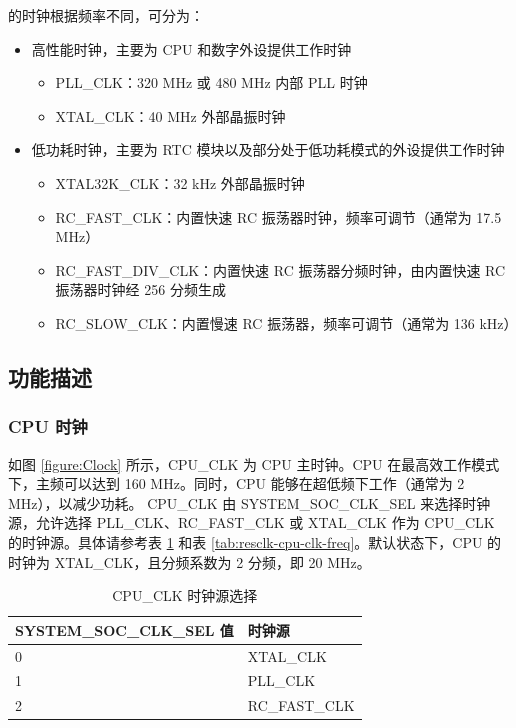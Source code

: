 \documentclass[main\_\_CN.tex]{subfiles}
\begin{document}
\chipname{} 的时钟根据频率不同，可分为：
\begin{itemize}
    \item 高性能时钟，主要为 CPU 和数字外设提供工作时钟
    \begin{itemize}
        \item PLL\_CLK：320 MHz 或 480 MHz 内部 PLL 时钟
        \item XTAL\_CLK：40 MHz 外部晶振时钟
    \end{itemize}
    \item 低功耗时钟，主要为 RTC 模块以及部分处于低功耗模式的外设提供工作时钟
    \begin{itemize}
        \item XTAL32K\_CLK：32 kHz 外部晶振时钟
	    \item RC\_FAST\_CLK：内置快速 RC 振荡器时钟，频率可调节（通常为 17.5 MHz）
	    \item RC\_FAST\_DIV\_CLK：内置快速 RC 振荡器分频时钟，由内置快速 RC 振荡器时钟经 256 分频生成
	    \item RC\_SLOW\_CLK：内置慢速 RC 振荡器，频率可调节（通常为 136 kHz）
    \end{itemize}
\end{itemize}

\subsection{功能描述}

\subsubsection{CPU 时钟}

如图 \ref{figure:Clock} 所示，CPU\_CLK 为 CPU 主时钟。CPU 在最高效工作模式下，主频可以达到 160 MHz。同时，CPU 能够在超低频下工作（通常为 2 MHz），以减少功耗。
CPU\_CLK 由 SYSTEM\_SOC\_CLK\_SEL 来选择时钟源，允许选择 PLL\_CLK、RC\_FAST\_CLK 或 XTAL\_CLK 作为 CPU\_CLK 的时钟源。具体请参考表 \ref{tab:resclk-cpu-clk-src} 和表 \ref{tab:resclk-cpu-clk-freq}。默认状态下，CPU 的时钟为 XTAL\_CLK，且分频系数为 2 分频，即 20 MHz。
\begin{longtable}[c]{|p{5cm}|p{5cm}| }
       \caption{CPU\_CLK 时钟源选择}
		\label{tab:resclk-cpu-clk-src} \\
	    \hline
        \rowcolor{lightgray}
        \textbf{SYSTEM\_SOC\_CLK\_SEL 值} & \textbf{时钟源} \\
        \hline
        0 & XTAL\_CLK \\
        \hline
        1 & PLL\_CLK \\
        \hline
        2 & RC\_FAST\_CLK \\
        \hline
\end{longtable}
\end{document}

